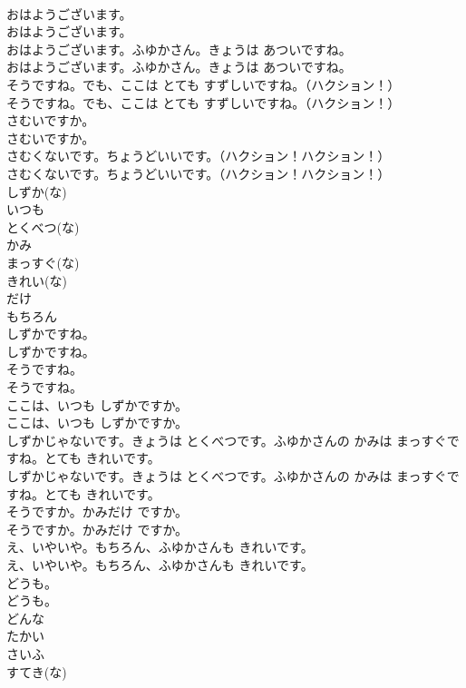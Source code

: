\documentclass[8pt]{extreport}
\begin{document}
\begin{CJK}{UTF8}{min}
\\	おはようございます。	
\\	おはようございます。 
\\	おはようございます。ふゆかさん。きょうは あついですね。	
\\	おはようございます。ふゆかさん。きょうは あついですね。 
\\	そうですね。でも、ここは とても すずしいですね。（ハクション！）	
\\	そうですね。でも、ここは とても すずしいですね。（ハクション！） 
\\	さむいですか。	
\\	さむいですか。 
\\	さむくないです。ちょうどいいです。（ハクション！ハクション！）	
\\	さむくないです。ちょうどいいです。（ハクション！ハクション！） 
\\	しずか(な)
\\	いつも
\\	とくべつ(な)
\\	かみ
\\	まっすぐ(な)
\\	きれい(な)
\\	だけ
\\	もちろん
\\	しずかですね。	
\\	しずかですね。 
\\	そうですね。	
\\	そうですね。 
\\	ここは、いつも しずかですか。	
\\	ここは、いつも しずかですか。 
\\	しずかじゃないです。きょうは とくべつです。ふゆかさんの かみは まっすぐですね。とても きれいです。	
\\	しずかじゃないです。きょうは とくべつです。ふゆかさんの かみは まっすぐですね。とても きれいです。 
\\	そうですか。かみだけ ですか。	
\\	そうですか。かみだけ ですか。 
\\	え、いやいや。もちろん、ふゆかさんも きれいです。	
\\	え、いやいや。もちろん、ふゆかさんも きれいです。 
\\	どうも。	
\\	どうも。 
\\	どんな
\\	たかい
\\	さいふ
\\	すてき(な)

\end{CJK}
\end{document}

